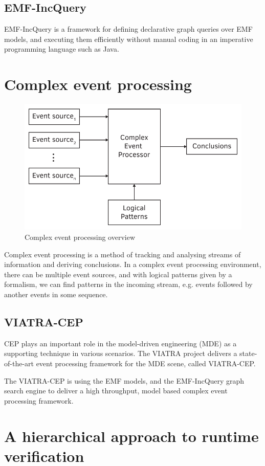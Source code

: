 \subsection{EMF-IncQuery}
EMF-IncQuery is a framework for defining declarative graph queries over EMF models, and executing them efficiently without manual coding in an imperative programming language such as Java. \cite{IncQuery}

\section{Complex event processing}

\begin{figure}[h]
	\centering
	\includegraphics[width=0.6\linewidth]{include/figures/chapter_1/CEP}
	\caption{Complex event processing overview}
	\label{fig:intro:vmodel}
\end{figure}

Complex event processing is a method of tracking and analysing streams of information and deriving conclusions. In a complex event processing environment, there can be multiple event sources, and with logical patterns given by a formalism, we can find patterns in the incoming stream, e.g. events followed by another events in some sequence.

\subsection{VIATRA-CEP}
CEP plays an important role in the model-driven engineering (MDE) as a supporting technique in various scenarios. The VIATRA project delivers a state-of-the-art event processing framework for the MDE scene, called VIATRA-CEP. \cite{CEP}

The VIATRA-CEP is using the EMF models, and the EMF-IncQuery graph search engine to deliver a high throughput, model based complex event processing framework.

\section{A hierarchical approach to runtime verification}

